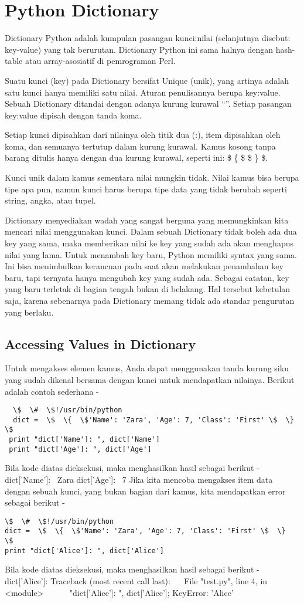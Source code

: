 \section{Python Dictionary}
Dictionary Python adalah kumpulan pasangan kunci:nilai (selanjutnya disebut: key-value) yang tak berurutan. Dictionary Python ini sama halnya dengan hash-table atau array-asosiatif di pemrograman Perl.

Suatu kunci (key) pada Dictionary bersifat Unique (unik), yang artinya adalah satu kunci hanya memiliki satu nilai. Aturan penulisannya berupa key:value. Sebuah Dictionary ditandai dengan adanya kurung kurawal “{}”. Setiap pasangan key:value dipisah dengan tanda koma. 

Setiap kunci dipisahkan dari nilainya oleh titik dua (:), item dipisahkan oleh koma, dan semuanya tertutup dalam kurung kurawal. Kamus kosong tanpa barang ditulis hanya dengan dua kurung kurawal, seperti ini:  \$  \{  \$ \$  \}  \$.

Kunci unik dalam kamus sementara nilai mungkin tidak. Nilai kamus bisa berupa tipe apa pun, namun kunci harus berupa tipe data yang tidak berubah seperti string, angka, atau tupel.

Dictionary menyediakan wadah yang sangat berguna yang memungkinkan kita mencari nilai menggunakan kunci\cite{oliphant2007python}. Dalam sebuah Dictionary tidak boleh ada dua key yang sama, maka memberikan nilai ke key yang sudah ada akan menghapus nilai yang lama. Untuk menambah key baru, Python memiliki syntax yang sama. Ini bisa menimbulkan kerancuan pada saat akan melakukan penambahan key baru, tapi ternyata hanya mengubah key yang sudah ada. Sebagai catatan, key yang baru terletak di bagian tengah bukan di belakang. Hal tersebut kebetulan saja, karena sebenarnya pada Dictionary memang tidak ada standar pengurutan yang berlaku.

\subsection{Accessing Values in Dictionary}
Untuk mengakses elemen kamus, Anda dapat menggunakan tanda kurung siku yang sudah dikenal bersama dengan kunci untuk mendapatkan nilainya. Berikut adalah contoh sederhana -
\begin{verbatim}  
  \$  \#  \$!/usr/bin/python
  dict =  \$  \{  \$'Name': 'Zara', 'Age': 7, 'Class': 'First' \$  \}  \$ 
 print "dict['Name']: ", dict['Name'] 
 print "dict['Age']: ", dict['Age']
\end{verbatim}
Bila kode diatas dieksekusi, maka menghasilkan hasil sebagai berikut -
dict['Name']:~ Zara
dict['Age']:~ 7 
Jika kita mencoba mengakses item data dengan sebuah kunci, yang bukan bagian dari kamus, kita mendapatkan error sebagai berikut -
\begin{verbatim} 
\$  \#  \$!/usr/bin/python
dict =  \$  \{  \$'Name': 'Zara', 'Age': 7, 'Class': 'First' \$  \}  \$ 
print "dict['Alice']: ", dict['Alice']
\end{verbatim}
Bila kode diatas dieksekusi, maka menghasilkan hasil sebagai berikut -
dict['Alice']: 
Traceback (most recent call last):
~~ File "test.py", line 4, in <module>
~~~~~  \print "dict['Alice']: ", dict['Alice']; 
KeyError: 'Alice' 

